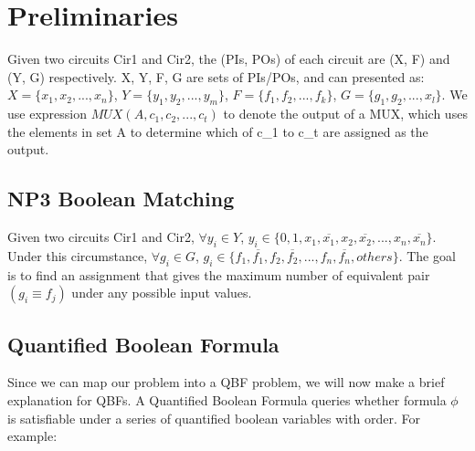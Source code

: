\section{Preliminaries}
Given two circuits Cir1 and Cir2, the (PIs, POs) of each circuit are (X, F) and (Y, G) respectively. X, Y, F, G are sets of PIs/POs, and can presented as: $X = \{x_1, x_2, ... , x_n\}$, $Y = \{y_1, y_2, ... , y_m\}$, $F = \{f_1, f_2, ... , f_k\}$, $G = \{g_1, g_2, ... , x_l\}$. We use expression $MUX(A, c_1, c_2, ... ,c_t)$ to denote the output of a MUX, which uses the elements in set A to determine which of c_1 to c_t are assigned as the output.


\subsection{NP3 Boolean Matching}
Given two circuits Cir1 and Cir2, $\forall y_i \in Y$, $ y_i \in \{0, 1, x_1, \overline{x_1}, x_2, \overline{x_2}, ... , x_n, \overline{x_n}\}$. Under this circumstance, $\forall g_i \in G$, $g_i \in \{f_1, \overline{f_1}, f_2, \overline{f_2}, ... , f_n, \overline{f_n}, others\}$. The goal is to find an assignment that gives the maximum number of equivalent pair $(g_i \equiv f_j)$ under any possible input values.

\subsection{Quantified Boolean Formula}
Since we can map our problem into a QBF problem, we will now make a brief explanation for QBFs. A Quantified Boolean Formula queries whether formula $\phi$ is satisfiable under a series of quantified boolean variables with order. For example: 

